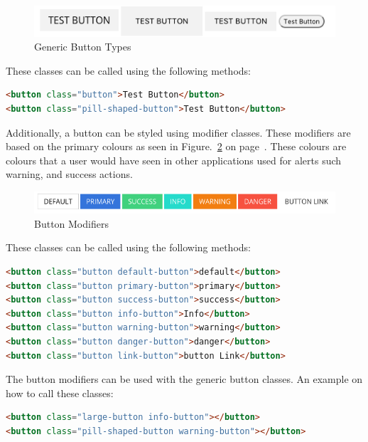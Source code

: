 \begin{figure}[h]
\centering
\includegraphics[scale=0.3]{images/generic-buttonsa}
\caption{Generic Button Types}
  \label{fig:genButtons}
\end{figure}

These classes can be called using the following methods:

\begin{lstlisting}[language=HTML]
 <button class="button">Test Button</button>
<button class="pill-shaped-button">Test Button</button>
\end{lstlisting}

Additionally, a button can be styled using modifier classes. These modifiers are based on the primary colours as seen in Figure.~\ref{fig:buttonMods} on  page~\pageref{fig:buttonMods}. These colours are colours that a user would have seen in other applications used for alerts such warning, and success actions. 

\begin{figure}[h]
\centering
\includegraphics[scale=0.3]{images/button-modifiers}
\caption{Button Modifiers}
  \label{fig:buttonMods}
\centering
\end{figure}


These classes can be called using the following methods:

\begin{lstlisting}[language=HTML]
<button class="button default-button">default</button>
<button class="button primary-button">primary</button>
<button class="button success-button">success</button>
<button class="button info-button">Info</button>
<button class="button warning-button">warning</button>
<button class="button danger-button">danger</button>
<button class="button link-button">button Link</button>
\end{lstlisting}

The button modifiers can be used with the generic button classes. An example on how to call these classes: 

\begin{lstlisting}[language=HTML]
<button class="large-button info-button"></button>
<button class="pill-shaped-button warning-button"></button>
\end{lstlisting}

